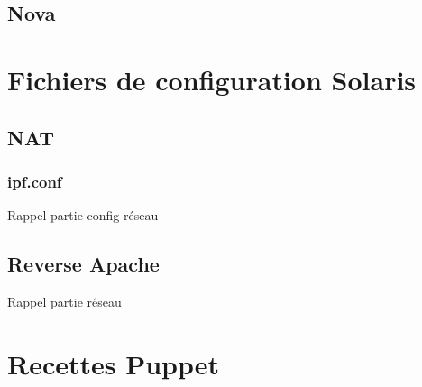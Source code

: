 \documentclass{report}
\begin{document}
\section{Nova}

\chapter{Fichiers de configuration Solaris}
\section{NAT}
\subsection{ipf.conf}
Rappel partie config réseau
\section{Reverse Apache}
Rappel partie réseau

\chapter{Recettes Puppet}
\end{document}
